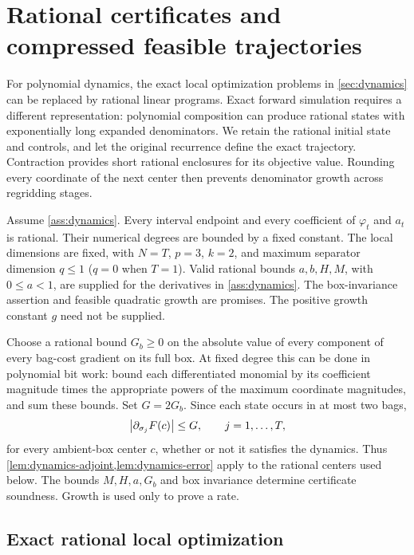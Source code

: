 \section{Rational certificates and compressed feasible trajectories}
\label{sec:dynamics-bit}

For polynomial dynamics, the exact local optimization problems in
\cref{sec:dynamics} can be replaced by rational linear programs.  Exact
forward simulation requires a different representation: polynomial
composition can produce rational states with exponentially long expanded
denominators.  We retain the rational initial state and controls, and let
the original recurrence define the exact trajectory.  Contraction provides
short rational enclosures for its objective value.  Rounding every
coordinate of the next center then prevents denominator growth across
regridding stages.

\begin{assumption}
\label{ass:dynamics-bit}
Assume \cref{ass:dynamics}.  Every interval endpoint and every coefficient
of $\varphi_t$ and $a_t$ is rational.  Their numerical degrees are bounded
by a fixed constant.  The local dimensions are fixed, with
$N=T$, $p=3$, $k=2$, and maximum separator dimension $q\le1$
($q=0$ when $T=1$).
Valid rational bounds $a,b,H,M$, with $0\le a<1$, are supplied for the
derivatives in \cref{ass:dynamics}.  The box-invariance assertion and
feasible quadratic growth are promises.  The positive growth constant
$g$ need not be supplied.
\end{assumption}

Choose a rational bound $G_b\ge0$ on the absolute value of every component
of every bag-cost gradient on its full box.  At fixed degree this can be
done in polynomial bit work: bound each differentiated monomial by its
coefficient magnitude times the appropriate powers of the maximum
coordinate magnitudes, and sum these bounds.  Set $G=2G_b$.  Since each
state occurs in at most two bags,
\[
 \left\lvert \partial_{\sigma_j}F(c)\right\rvert\le G,\qquad j=1,\ldots,T,
\]
for every ambient-box center $c$, whether or not it satisfies the dynamics.
Thus \cref{lem:dynamics-adjoint,lem:dynamics-error} apply to the rational
centers used below.  The bounds $M,H,a,G_b$ and box invariance determine
certificate soundness.  Growth is used only to prove a rate.

\subsection{Exact rational local optimization}

